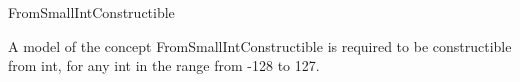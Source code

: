 \begin{ccRefConcept}{FromSmallIntConstructible}


\ccDefinition
  
A model of the concept FromSmallIntConstructible is required 
to be constructible from int, 
for any int in the range from -128 to 127. 

\ccCreation
{}  %


\ccHasModels
{}\\
\\
\\


\end{ccRefConcept}